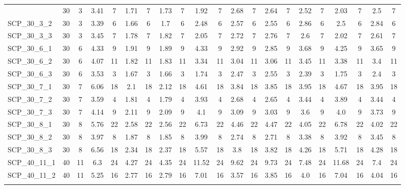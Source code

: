 \begin{sidewaystable}[!ht]
{\begin{tabular}{lcccccccccccccccccccc}
{SCP\_30\_3\_1 & 30 & 3 & 3.41 & 7 &  \textcolor{blue2}{1.71} & 7 & 1.73 & 7 & 1.92 & 7 & 2.68 & 7 & 2.64 & 7 & 2.52 & 7 & 2.03 & 7 & 2.5 & 7 \\
SCP\_30\_3\_2 & 30 & 3 & 3.39 & 6 &  \textcolor{blue2}{1.66} & 6 & 1.7 & 6 & 2.48 & 6 & 2.57 & 6 & 2.55 & 6 & 2.86 & 6 & 2.5 & 6 & 2.84 & 6 \\
SCP\_30\_3\_3 & 30 & 3 & 3.45 & 7 &  \textcolor{blue2}{1.78} & 7 & 1.82 & 7 & 2.05 & 7 & 2.72 & 7 & 2.76 & 7 & 2.6 & 7 & 2.02 & 7 & 2.61 & 7 \\
SCP\_30\_6\_1 & 30 & 6 & 4.33 & 9 & 1.91 & 9 &  \textcolor{blue2}{1.89} & 9 & 4.33 & 9 & 2.92 & 9 & 2.85 & 9 & 3.68 & 9 & 4.25 & 9 & 3.65 & 9 \\
SCP\_30\_6\_2 & 30 & 6 & 4.07 & 11 &  \textcolor{blue2}{1.82} & 11 & 1.83 & 11 & 3.34 & 11 & 3.04 & 11 & 3.06 & 11 & 3.45 & 11 & 3.38 & 11 & 3.4 & 11 \\
SCP\_30\_6\_3 & 30 & 6 & 3.53 & 3 & 1.67 & 3 &  \textcolor{blue2}{1.66} & 3 & 1.74 & 3 & 2.47 & 3 & 2.55 & 3 & 2.39 & 3 & 1.75 & 3 & 2.4 & 3 \\
SCP\_30\_7\_1 & 30 & 7 & 6.06 & 18 &  \textcolor{blue2}{2.1} & 18 & 2.12 & 18 & 4.61 & 18 & 3.84 & 18 & 3.85 & 18 & 3.95 & 18 & 4.67 & 18 & 3.95 & 18 \\
SCP\_30\_7\_2 & 30 & 7 & 3.59 & 4 & 1.81 & 4 &  \textcolor{blue2}{1.79} & 4 & 3.93 & 4 & 2.68 & 4 & 2.65 & 4 & 3.44 & 4 & 3.89 & 4 & 3.44 & 4 \\
SCP\_30\_7\_3 & 30 & 7 & 4.14 & 9 & 2.11 & 9 &  \textcolor{blue2}{2.09} & 9 & 4.1 & 9 & 3.09 & 9 & 3.03 & 9 & 3.6 & 9 & 4.0 & 9 & 3.73 & 9 \\
SCP\_30\_8\_1 & 30 & 8 & 5.76 & 22 & 2.58 & 22 &  \textcolor{blue2}{2.56} & 22 & 6.73 & 22 & 4.46 & 22 & 4.47 & 22 & 4.05 & 22 & 6.78 & 22 & 4.02 & 22 \\
SCP\_30\_8\_2 & 30 & 8 & 3.97 & 8 & 1.87 & 8 &  \textcolor{blue2}{1.85} & 8 & 3.99 & 8 & 2.74 & 8 & 2.71 & 8 & 3.38 & 8 & 3.92 & 8 & 3.45 & 8 \\
SCP\_30\_8\_3 & 30 & 8 & 6.56 & 18 &  \textcolor{blue2}{2.34} & 18 & 2.37 & 18 & 5.57 & 18 & 3.8 & 18 & 3.82 & 18 & 4.26 & 18 & 5.71 & 18 & 4.28 & 18 \\
SCP\_40\_11\_1 & 40 & 11 & 6.3 & 24 &  \textcolor{blue2}{4.27} & 24 & 4.35 & 24 & 11.52 & 24 & 9.62 & 24 & 9.73 & 24 & 7.48 & 24 & 11.68 & 24 & 7.4 & 24 \\
SCP\_40\_11\_2 & 40 & 11 & 5.25 & 16 &  \textcolor{blue2}{2.77} & 16 & 2.79 & 16 & 7.01 & 16 & 3.57 & 16 & 3.85 & 16 & 4.0 & 16 & 7.04 & 16 & 4.04 & 16 \\
}
\end{tabular}}
\end{sidewaystable}
